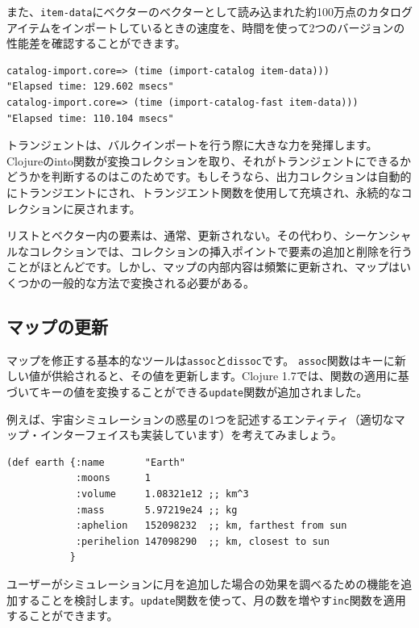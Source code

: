 また、\texttt{item-data}にベクターのベクターとして読み込まれた約100万点のカタログアイテムをインポートしているときの速度を、時間を使って2つのバージョンの性能差を確認することができます。

\begin{lstlisting}[numbers=none]
catalog-import.core=> (time (import-catalog item-data)))
"Elapsed time: 129.602 msecs"
catalog-import.core=> (time (import-catalog-fast item-data)))
"Elapsed time: 110.104 msecs"
\end{lstlisting}

トランジェントは、バルクインポートを行う際に大きな力を発揮します。Clojureのinto関数が変換コレクションを取り、それがトランジェントにできるかどうかを判断するのはこのためです。もしそうなら、出力コレクションは自動的にトランジエントにされ、トランジエント関数を使用して充填され、永続的なコレクションに戻されます。

リストとベクター内の要素は、通常、更新されない。その代わり、シーケンシャルなコレクションでは、コレクションの挿入ポイントで要素の追加と削除を行うことがほとんどです。しかし、マップの内部内容は頻繁に更新され、マップはいくつかの一般的な方法で変換される必要がある。

\subsection{マップの更新}

マップを修正する基本的なツールは\texttt{assoc}と\texttt{dissoc}です。 \texttt{assoc}関数はキーに新しい値が供給されると、その値を更新します。Clojure 1.7では、関数の適用に基づいてキーの値を変換することができる\texttt{update}関数が追加されました。

例えば、宇宙シミュレーションの惑星の1つを記述するエンティティ（適切なマップ・インターフェイスも実装しています）を考えてみましょう。



\begin{lstlisting}[numbers=none]
(def earth {:name       "Earth"
            :moons      1
            :volume     1.08321e12 ;; km^3
            :mass       5.97219e24 ;; kg
            :aphelion   152098232  ;; km, farthest from sun
            :perihelion 147098290  ;; km, closest to sun
           }
\end{lstlisting}

ユーザーがシミュレーションに月を追加した場合の効果を調べるための機能を追加することを検討します。\texttt{update}関数を使って、月の数を増やす\texttt{inc}関数を適用することができます。


